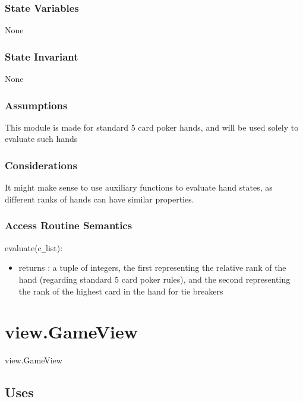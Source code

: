 \documentclass[12pt, titlepage]{article}
\begin{document}
\subsubsection* {State Variables}

None

\subsubsection* {State Invariant}

None

\subsubsection* {Assumptions}

This module is made for standard 5 card poker hands, and will be used solely to evaluate such hands

\subsubsection* {Considerations}

It might make sense to use auxiliary functions to evaluate hand states, as different ranks of hands can have similar properties.

\subsubsection* {Access Routine Semantics}

\noindent evaluate(c\verb|_|list):
\begin{itemize}
\item returns : a tuple of integers, the first representing the relative rank of the hand (regarding standard 5 card poker rules), and the second representing the rank of the highest card in the hand for tie breakers 
\end{itemize}


\section* {view.GameView}

view.GameView

\subsection* {Uses}
\end{document}
